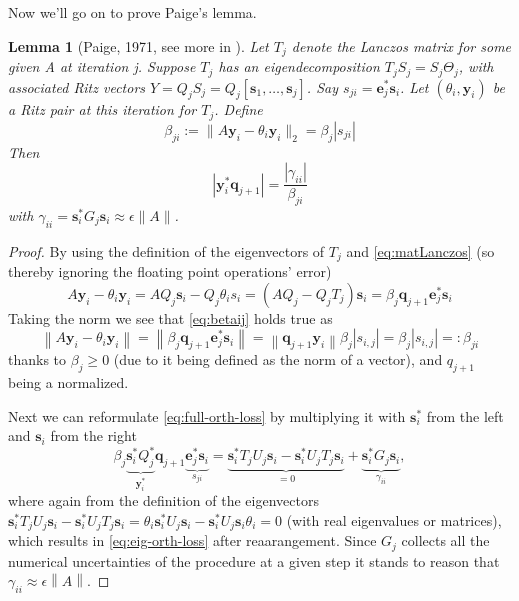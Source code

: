 \documentclass{article}
\newtheorem{lemma}{Lemma}
\begin{document}
Now we'll go on to prove Paige's lemma.
\begin{lemma}[Paige, 1971, see more in \autocite{paige-1980}]\label{lemma:paige}
	Let $T_j$ denote the Lanczos matrix for some given A at iteration j. Suppose $T_j$ has an eigendecomposition $T_jS_j=S_j\Theta_j$, with associated Ritz vectors $Y=Q_jS_j=Q_j[\mathbf{s}_1,\dots,\mathbf{s}_j]$. Say $s_{ji}=\mathbf{e}_j^{\ast}\mathbf{s}_i$. Let
	$(\theta_i , \textbf{y}_i)$ be a Ritz pair at this iteration for $T_j$. Define 
	\begin{equation}\label{eq:betaij}
		\beta_{ji} := \|A\textbf{y}_i - \theta_i \textbf{y}_i\|_2=\beta_j|s_{ji}|
	\end{equation}
	Then
	\begin{equation}\label{eq:eig-orth-loss}
		|\textbf{y}_i^{\ast}\textbf{q}_{j+1}| =\frac{|\gamma_{ii}|}{\beta_{ji}}
	\end{equation}
	with $\gamma_{ii}=\mathbf{s}_i^{\ast}G_{j}\mathbf{s}_i\approx\epsilon\|A\|$.
\end{lemma}
\begin{proof}
	By using the definition of the eigenvectors of $T_j$ and \autoref{eq:matLanczos} (so thereby ignoring the floating point operations' error)
	\begin{equation*}
		A \textbf{y}_i - \theta_i \textbf{y}_i = A Q_j \textbf{s}_i - Q_j \theta_i s_i = \left(A Q_j - Q_j T_j  \right) \textbf{s}_i = \beta_j \textbf{q}_{j+1} \textbf{e}_j^\ast \textbf{s}_i
	\end{equation*}
	Taking the norm we see that \autoref{eq:betaij} holds true as
	\begin{equation*}
		\left\lVert A \textbf{y}_i - \theta_i \textbf{y}_i \right\rVert =\left\lVert \beta_{j} \textbf{q}_{j+1} \textbf{e}_j^\ast \textbf{s}_i \right\rVert =\left\lVert \textbf{q}_{j+1} \textbf{y}_i \right\rVert  \beta_{j} \left|s_{i,j}\right| = \beta_{j} \left|s_{i,j}\right| =: \beta_{ji}
	\end{equation*}
	thanks to $\beta_j\geq 0$ (due to it being defined as the norm of a vector), and $q_{j+1}$ being a normalized.
	
	Next we can reformulate \autoref{eq:full-orth-loss} by multiplying it with $\textbf{s}_i^\ast$ from the left and $\textbf{s}_i$ from the right
	\begin{equation*}
		\beta_j \underbrace{\textbf{s}_i^\ast Q_j^\ast}_{\textbf{y}_i^\ast} \textbf{q}_{j+1} \underbrace{\textbf{e}_j^\ast\textbf{s}_i}_{s_{ji}} = \underbrace{\textbf{s}_i^\ast T_j U_j \textbf{s}_i - \textbf{s}_i^\ast U_j T_j \textbf{s}_i}_{=0} + \underbrace{\textbf{s}_i^\ast G_j \textbf{s}_i}_{\gamma_{ii}},
	\end{equation*}
	where again from the definition of the eigenvectors $\textbf{s}_i^\ast T_j U_j \textbf{s}_i - \textbf{s}_i^\ast U_j T_j \textbf{s}_i=\theta_i \textbf{s}_i^\ast U_j \textbf{s}_i - \textbf{s}_i^\ast U_j \textbf{s}_i \theta_i = 0$ (with real eigenvalues or matrices), which results in \autoref{eq:eig-orth-loss} after reaarangement. Since $G_j$ collects all the numerical uncertainties of the procedure at a given step it stands to reason that $\gamma_{ii} \approx \epsilon\left\lVert A \right\rVert$.
	
\end{proof}
\end{document}
